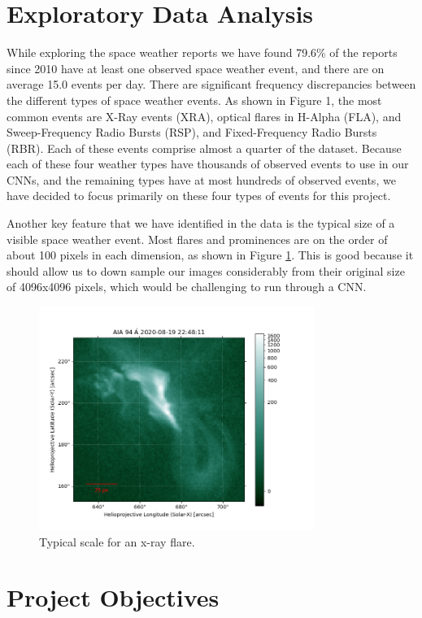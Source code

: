 \documentclass[12pt, letterpaper]{article}
\begin{document}
\section*{Exploratory Data Analysis}
While exploring the space weather reports we have found 79.6\% of the reports since 2010 have at least one observed space weather event, and there are on average 15.0 events per day. There are significant frequency discrepancies between the different types of space weather events. As shown in Figure 1, the most common events are X-Ray events (XRA), optical flares in H-Alpha (FLA), and Sweep-Frequency Radio Bursts (RSP), and Fixed-Frequency Radio Bursts (RBR). Each of these events comprise almost a quarter of the dataset. Because each of these four weather types have thousands of observed events to use in our CNNs, and the remaining types have at most hundreds of observed events, we have decided to focus primarily on these four types of events for this project. 

Another key feature that we have identified in the data is the typical size of a visible space weather event. Most flares and prominences are on the order of about 100 pixels in each dimension, as shown in Figure \ref{event_size}. This is good because it should allow us to down sample our images considerably from their original size of 4096x4096 pixels, which would be challenging to run through a CNN. 

\begin{figure}[h]
	\includegraphics[width=0.8\textwidth]{figures/feature_scale.png}
	\centering
	\caption{Typical scale for an x-ray flare.}
	\label{event_size}
\end{figure}


\section*{Project Objectives}
\end{document}
